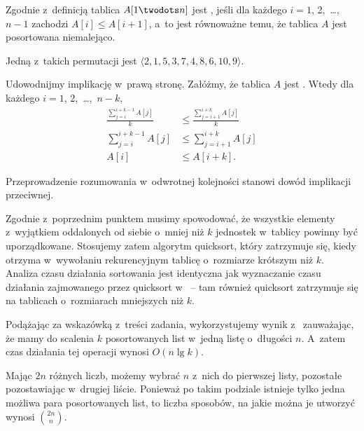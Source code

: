 \subproblem %


\subproblem %
Zgodnie z~definicją tablica $A[1\twodots n]$ jest , jeśli dla każdego $i=1$, 2,~\dots,~$n-1$ zachodzi $A[i]\le A[i+1]$, a~to jest równoważne temu, że tablica $A$ jest posortowana niemalejąco.

\subproblem %
Jedną z~takich permutacji jest $\langle2,1,5,3,7,4,8,6,10,9\rangle$.

\subproblem %
Udowodnijmy implikację w~prawą stronę. Załóżmy, że tablica $A$ jest . Wtedy dla każdego $i=1$, 2,~\dots,~$n-k$,
\begin{align*}
	\frac{\sum_{j=i}^{i+k-1}A[j]}{k} &\le \frac{\sum_{j=i+1}^{i+k}A[j]}{k} \\[1mm]
	\sum_{j=i}^{i+k-1}A[j] &\le \sum_{j=i+1}^{i+k}A[j] \\[1mm]
	A[i] &\le A[i+k].
\end{align*}

Przeprowadzenie rozumowania w~odwrotnej kolejności stanowi dowód implikacji przeciwnej.

\subproblem %
Zgodnie z~poprzednim punktem musimy spowodować, że wszystkie elementy z~wyjątkiem oddalonych od siebie o~mniej niż $k$ jednostek w~tablicy powinny być uporządkowane. Stosujemy zatem algorytm quicksort, który zatrzymuje się, kiedy otrzyma w~wywołaniu rekurencyjnym tablicę o~rozmiarze krótszym niż $k$. Analiza czasu działania sortowania jest identyczna jak wyznaczanie czasu działania zajmowanego przez quicksort w~ -- tam również quicksort zatrzymuje się na tablicach o~rozmiarach mniejszych niż $k$.

\subproblem %
Podążając za wskazówką z~treści zadania, wykorzystujemy wynik z~ zauważając, że mamy do scalenia $k$ posortowanych list w~jedną listę o~długości $n$. A~zatem czas działania tej operacji wynosi $O(n\lg k)$.

\subproblem %


\subproblem %
Mając $2n$ różnych liczb, możemy wybrać $n$ z~nich do pierwszej listy, pozostałe pozostawiając w~drugiej liście. Ponieważ po takim podziale istnieje tylko jedna możliwa para posortowanych list, to liczba sposobów, na jakie można je utworzyć wynosi $\binom{2n}{n}$.

\subproblem %
\subproblem %
\subproblem %

\endinput
